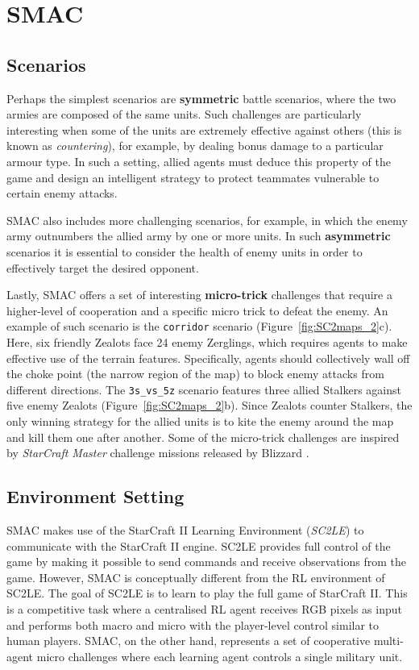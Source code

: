\section{SMAC}\label{appendix:SMAC}

\subsection{Scenarios}\label{appendix:SMAC_scenarios}

Perhaps the simplest scenarios are \textbf{symmetric} battle scenarios, where the two armies are composed of the same units.
Such challenges are particularly interesting when some of the units are extremely effective against others (this is known as \textit{countering}), for example, by dealing bonus damage to a particular armour type.
In such a setting, allied agents must deduce this property of the game and design an intelligent strategy to protect teammates vulnerable to certain enemy attacks.

SMAC also includes more challenging scenarios, for example, in which the enemy army outnumbers the allied army by one or more units. In such \textbf{asymmetric} scenarios it is essential to consider the health of enemy units in order to effectively target the desired opponent.

Lastly, SMAC offers a set of interesting \textbf{micro-trick} challenges that require a higher-level of cooperation and a specific micro trick to defeat the enemy. 
An example of such scenario is the \texttt{corridor} scenario (Figure~\ref{fig:SC2maps_2}c). Here, six friendly Zealots face 24 enemy Zerglings, which requires agents to make effective use of the terrain features. Specifically, agents should collectively wall off the choke point (the narrow region of the map) to block enemy attacks from different directions. 
The \texttt{3s\_vs\_5z} scenario features three allied Stalkers against five enemy Zealots (Figure~\ref{fig:SC2maps_2}b). Since Zealots counter Stalkers, the only winning strategy for the allied units is to kite the enemy around the map and kill them one after another.
Some of the micro-trick challenges are inspired by \textit{StarCraft Master} challenge missions released by Blizzard \cite{SC2Master}.

\subsection{Environment Setting}\label{appendix:SMAC_evn_setting}

SMAC makes use of the StarCraft II Learning Environment (\textit{SC2LE}) \cite{vinyals_starcraft_2017} to communicate with the StarCraft II engine. SC2LE provides full control of the game by making it possible to send commands and receive observations from the game. However, SMAC is conceptually different from the RL environment of SC2LE. The goal of SC2LE is to learn to play the full game of StarCraft II. This is a competitive task where a centralised RL agent receives RGB pixels as input and performs both macro and micro with the player-level control similar to human players. SMAC, on the other hand, represents a set of cooperative multi-agent micro challenges where each learning agent controls a single military unit.

